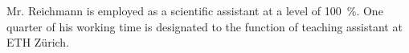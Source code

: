 
Mr. Reichmann is employed as a scientific assistant at a level of \SI{100}{\%}. One quarter of his working time is designated to the function of teaching assistant at ETH Z\"urich.